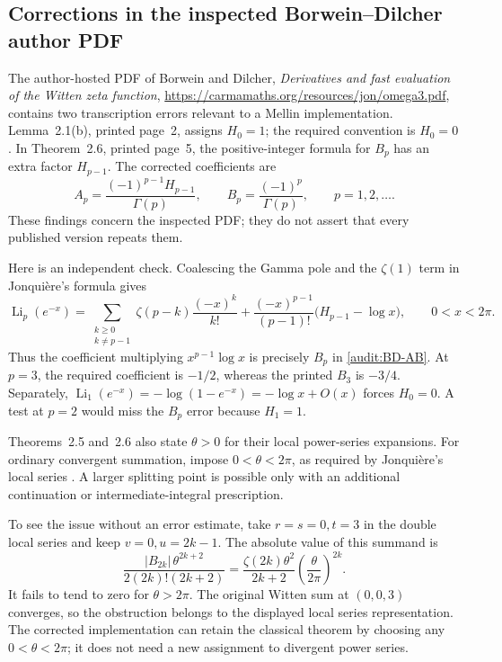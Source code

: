\documentclass[11pt,a4paper]{article}
\theoremstyle{definition}
\theoremstyle{remark}
\numberwithin{equation}{section}
\begin{document}
\subsection{Corrections in the inspected Borwein--Dilcher author PDF}
\label{audit:BD}

The author-hosted PDF of Borwein and Dilcher,
\emph{Derivatives and fast evaluation of the Witten zeta function},
\url{https://carmamaths.org/resources/jon/omega3.pdf}, contains two
transcription errors relevant to a Mellin implementation.  Lemma~2.1(b),
printed page~2, assigns $H_0=1$; the required convention is $H_0=0$.
In Theorem~2.6, printed page~5, the positive-integer formula for $B_p$
has an extra factor $H_{p-1}$.  The corrected coefficients are
\begin{equation}\label{audit:BD-AB}
 A_p=\frac{(-1)^{p-1}H_{p-1}}{\Gamma(p)},\qquad
 B_p=\frac{(-1)^p}{\Gamma(p)},\qquad p=1,2,\ldots.
\end{equation}
These findings concern the inspected PDF; they do not assert that every
published version repeats them.

Here is an independent check.  Coalescing the Gamma pole and the
$\zeta(1)$ term in Jonqui\`ere's formula gives
\begin{equation}\label{audit:integer-Jonquiere}
 \operatorname{Li}_p(e^{-x})
 =\sum_{\substack{k\ge0\\k\ne p-1}}
       \zeta(p-k)\frac{(-x)^k}{k!}
 +\frac{(-x)^{p-1}}{(p-1)!}\bigl(H_{p-1}-\log x\bigr),
 \qquad 0<x<2\pi.
\end{equation}
Thus the coefficient multiplying $x^{p-1}\log x$ is precisely $B_p$
in \eqref{audit:BD-AB}.  At $p=3$, the required coefficient is $-1/2$,
whereas the printed $B_3$ is $-3/4$.  Separately,
$\operatorname{Li}_1(e^{-x})=-\log(1-e^{-x})=-\log x+O(x)$ forces
$H_0=0$.  A test at $p=2$ would miss the $B_p$ error because $H_1=1$.

Theorems~2.5 and~2.6 also state $\theta>0$ for their local power-series
expansions.  For ordinary convergent summation, impose
$0<\theta<2\pi$, as required by Jonqui\`ere's local series
\cite[25.12.12]{DLMFpolylog}.  A larger splitting point is possible only
with an additional continuation or intermediate-integral prescription.

To see the issue without an error estimate, take $r=s=0,t=3$ in the
double local series and keep $v=0,u=2k-1$.  The absolute value of this
summand is
\[
 \frac{|B_{2k}|\,\theta^{2k+2}}{2(2k)!(2k+2)}
 =\frac{\zeta(2k)\theta^2}{2k+2}
                       \left(\frac\theta{2\pi}\right)^{2k}.
\]
It fails to tend to zero for $\theta>2\pi$.  The original Witten sum at
$(0,0,3)$ converges, so the obstruction belongs to the displayed local
series representation.  The corrected implementation can retain the
classical theorem by choosing any $0<\theta<2\pi$; it does not need a
new assignment to divergent power series.
\end{document}
